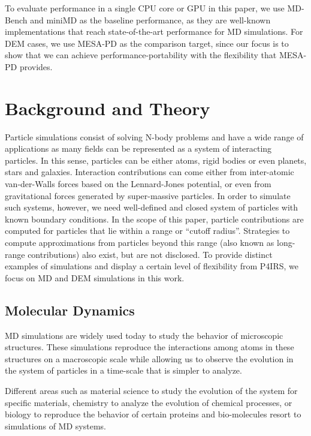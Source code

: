 \documentclass[preprint,12pt]{elsarticle}
\begin{document}
To evaluate performance in a single CPU core or GPU in this paper, we use MD-Bench and miniMD as the baseline performance, as they are well-known implementations that reach state-of-the-art performance for MD simulations.
For DEM cases, we use MESA-PD as the comparison target, since our focus is to show that we can achieve performance-portability with the flexibility that MESA-PD provides. 

\section{Background and Theory}
\label{sec:background}

Particle simulations consist of solving N-body problems and have a wide range of applications as many fields can be represented as a system of interacting particles.
In this sense, particles can be either atoms, rigid bodies or even planets, stars and galaxies.
Interaction contributions can come either from inter-atomic van-der-Walls forces based on the Lennard-Jones potential, or even from gravitational forces generated by super-massive particles.
In order to simulate such systems, however, we need well-defined and closed system of particles with known boundary conditions.
In the scope of this paper, particle contributions are computed for particles that lie within a range or ``cutoff radius''. 
Strategies to compute approximations from particles beyond this range (also known as long-range contributions) also exist, but are not disclosed.
To provide distinct examples of simulations and display a certain level of flexibility from P4IRS, we focus on MD and DEM simulations in this work.

\subsection{Molecular Dynamics}
\label{sec:md}

\ac{MD} simulations are widely used today to study the behavior of microscopic structures.
These simulations reproduce the interactions among atoms in these structures on a macroscopic scale while allowing us to observe the evolution in the system of particles in a time-scale that is simpler to analyze.

Different areas such as material science to study the evolution of the system for specific materials, chemistry to analyze the evolution of chemical processes, or biology to reproduce the behavior of certain proteins and bio-molecules resort to simulations of \ac{MD} systems.
\end{document}
